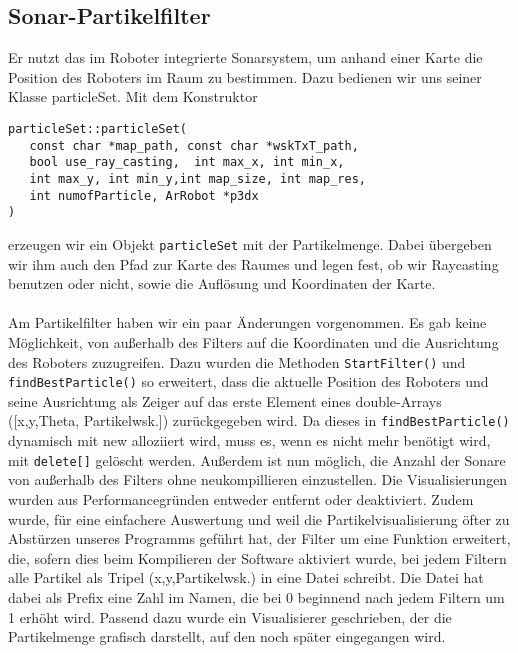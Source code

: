 \subsection{Sonar-Partikelfilter}
\label{sec:sonarparticlefilter}
Er nutzt das im Roboter integrierte
Sonarsystem, um anhand einer Karte die Position des Roboters im Raum
zu bestimmen. Dazu bedienen wir uns seiner Klasse particleSet. 
Mit dem Konstruktor 
\begin{lstlisting}
particleSet::particleSet(
   const char *map_path, const char *wskTxT_path, 
   bool use_ray_casting,  int max_x, int min_x, 
   int max_y, int min_y,int map_size, int map_res, 
   int numofParticle, ArRobot *p3dx
)
\end{lstlisting}
erzeugen wir ein Objekt
\lstinline|particleSet| mit der Partikelmenge. Dabei übergeben wir ihm auch den Pfad zur
Karte des Raumes und legen fest, ob wir Raycasting benutzen oder
nicht, sowie die Auflösung und Koordinaten der Karte.  \\\\
Am Partikelfilter haben wir ein paar Änderungen vorgenommen. Es gab keine
Möglichkeit, von außerhalb des Filters auf die Koordinaten und die
Ausrichtung des Roboters zuzugreifen. Dazu wurden die Methoden
\lstinline|StartFilter()|
und \lstinline|findBestParticle()| so erweitert, dass die aktuelle Position des Roboters
und seine Ausrichtung als Zeiger auf das erste Element eines double-Arrays
([x,y,Theta, Partikelwsk.]) zurückgegeben wird. Da dieses in
\lstinline|findBestParticle()| dynamisch mit new alloziiert wird, muss es, wenn es nicht
mehr benötigt wird, mit \lstinline|delete[]| gelöscht werden. Außerdem ist nun
möglich, 
die Anzahl der Sonare von außerhalb des Filters ohne neukompillieren
einzustellen. Die Visualisierungen wurden aus Performancegründen entweder
entfernt oder deaktiviert. Zudem wurde, für eine einfachere Auswertung und
weil die Partikelvisualisierung öfter zu Abstürzen unseres Programms
geführt hat, der Filter um eine Funktion erweitert, die, sofern dies
beim Kompilieren der Software aktiviert wurde,  bei jedem Filtern alle Partikel als
Tripel (x,y,Partikelwsk.) in eine Datei schreibt. Die Datei hat
dabei als Prefix eine Zahl im Namen, die bei 0 beginnend nach jedem Filtern
 um 1 erhöht wird. Passend dazu wurde ein Visualisierer geschrieben, der
die Partikelmenge grafisch darstellt, auf den noch später eingegangen
wird.

